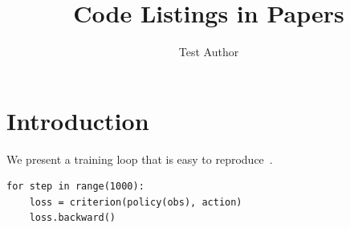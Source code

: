 \documentclass{article}
\title{Code Listings in Papers}
\author{Test Author}
\begin{document}
\maketitle
\section{Introduction}
We present a training loop that is easy to reproduce~\cite{smith2020}.
\begin{listing}[ht]
\begin{verbatim}
for step in range(1000):
    loss = criterion(policy(obs), action)
    loss.backward()
\end{verbatim}
\caption{Training loop.}
\end{listing}


\end{document}
